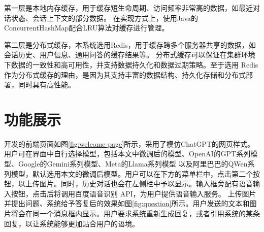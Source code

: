 第一层是本地内存缓存，用于缓存短生命周期、访问频率非常高的数据，如最近对话状态、会话上下文的部分数据。
在实现方式上，使用Java的ConcurrentHashMap配合LRU算法对缓存进行管理。

第二层是分布式缓存，本系统选用Redis，用于缓存跨多个服务器共享的数据，如会话历史、用户信息、通用问答的缓存结果等。
分布式缓存可以保证在集群环境下数据的一致性和高可用性，并支持数据持久化和数据过期策略。至于选用
Redis作为分布式缓存的理由，是因为其支持丰富的数据结构、持久化存储和分布式部署，同时具有高性能。

\section{功能展示}
开发的前端页面如图\ref{fig:welcome-page}所示，采用了模仿ChatGPT的网页样式。
用户可在界面中自行选择模型，包括本文中微调后的模型、OpenAI的GPT系列模型、Google的Gemini系列模型、Meta的Llama系列模型
以及阿里巴巴的QWen系列模型，默认选用本文的微调后模型。用户可以在下方的菜单栏中，点击第二个按钮，以上传图片。同时，历史对话也会在左侧栏中予以显示。输入框旁配有语音输入按钮，点击后将调用百度语音识别 API，为用户提供语音输入服务。
上传图片并提出问题、系统给予答复后的效果如图\ref{fig:question}所示。用户发送的文本和图片将会在同一个消息框内显示。用户要求系统重新生成回复，或者引用系统的某条回复，以让系统能够更加贴合用户的语境。


